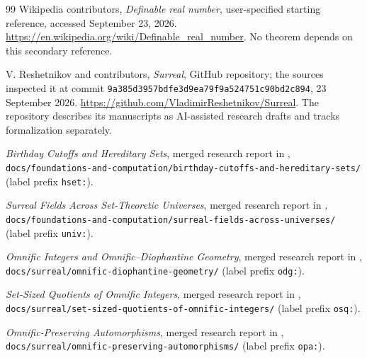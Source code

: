 \documentclass[11pt,a4paper]{article}
\numberwithin{equation}{section}
\theoremstyle{definition}
\theoremstyle{remark}
\newcommand{\repoSHA}{\texttt{9a385d3957bdfe3d9ea79f9a524751c90bd2c894}}
\newcommand{\repopath}[1]{\nolinkurl{#1}}
\begin{document}
\begin{thebibliography}{99}
Wikipedia contributors, \emph{Definable real number},
user-specified starting reference, accessed September 23, 2026.
\url{https://en.wikipedia.org/wiki/Definable_real_number}.
No theorem depends on this secondary reference.

V. Reshetnikov and contributors, \emph{Surreal}, GitHub repository;
the sources inspected it at commit \repoSHA, 23 September 2026.
\url{https://github.com/VladimirReshetnikov/Surreal}.
The repository describes its manuscripts as AI-assisted research drafts and
tracks formalization separately.

\emph{Birthday Cutoffs and Hereditary Sets}, merged research report in
\cite{Repo},
\repopath{docs/foundations-and-computation/birthday-cutoffs-and-hereditary-sets/}
(label prefix \texttt{hset:}).

\emph{Surreal Fields Across Set-Theoretic Universes}, merged research report
in \cite{Repo},
\repopath{docs/foundations-and-computation/surreal-fields-across-universes/}
(label prefix \texttt{univ:}).

\emph{Omnific Integers and Omnific--Diophantine Geometry}, merged research
report in \cite{Repo},
\repopath{docs/surreal/omnific-diophantine-geometry/}
(label prefix \texttt{odg:}).

\emph{Set-Sized Quotients of Omnific Integers}, merged research report in
\cite{Repo},
\repopath{docs/surreal/set-sized-quotients-of-omnific-integers/}
(label prefix \texttt{osq:}).

\emph{Omnific-Preserving Automorphisms}, merged research report in
\cite{Repo},
\repopath{docs/surreal/omnific-preserving-automorphisms/}
(label prefix \texttt{opa:}).

\end{thebibliography}
\end{document}
